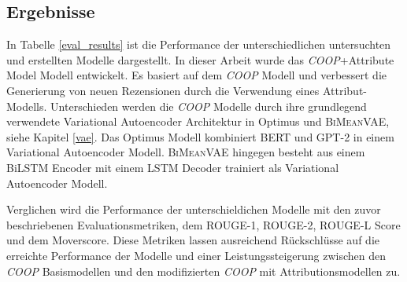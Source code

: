 


\subsection{Ergebnisse}
\label{eval_results_chapter}
In Tabelle \ref{eval_results} ist die Performance der unterschiedlichen untersuchten und erstellten Modelle dargestellt.
In dieser Arbeit wurde das \glqq \textit{COOP}+Attribute Model\grqq{} Modell entwickelt.
Es basiert auf dem \textit{COOP} Modell und verbessert die Generierung von neuen Rezensionen durch die Verwendung eines Attribut-Modells.
Unterschieden werden die \textit{COOP} Modelle durch ihre grundlegend verwendete Variational Autoencoder Architektur in Optimus und \textsc{BiMeanVAE}, siehe Kapitel \ref{vae}.
Das Optimus Modell kombiniert BERT und GPT-2 in einem Variational Autoencoder Modell. \textsc{BiMeanVAE} hingegen besteht aus einem BiLSTM Encoder mit einem LSTM Decoder trainiert als Variational Autoencoder Modell.

Verglichen wird die Performance der unterschieldichen Modelle mit den zuvor beschriebenen Evaluationsmetriken, dem ROUGE-1, ROUGE-2, ROUGE-L Score und dem Moverscore.
Diese Metriken lassen ausreichend Rückschlüsse auf die erreichte Performance der Modelle und einer Leistungssteigerung zwischen den \textit{COOP} Basismodellen und den modifizierten \textit{COOP} mit Attributionsmodellen zu.


